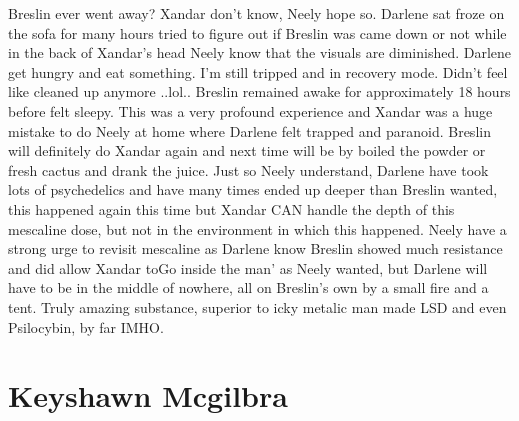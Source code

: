 \documentclass[12pt]{book}
\begin{document}
Breslin ever went away? Xandar don't know, Neely hope so. Darlene sat froze on the sofa for many hours tried to figure out if Breslin was came down or not while in the back of Xandar's head Neely know that the visuals are diminished. Darlene get hungry and eat something. I'm still tripped and in recovery mode. Didn't feel like cleaned up anymore ..lol.. Breslin remained awake for approximately 18 hours before felt sleepy. This was a very profound experience and Xandar was a huge mistake to do Neely at home where Darlene felt trapped and paranoid. Breslin will definitely do Xandar again and next time will be by boiled the powder or fresh cactus and drank the juice. Just so Neely understand, Darlene have took lots of psychedelics and have many times ended up deeper than Breslin wanted, this happened again this time but Xandar CAN handle the depth of this mescaline dose, but not in the environment in which this happened. Neely have a strong urge to revisit mescaline as Darlene know Breslin showed much resistance and did allow Xandar toGo inside the man' as Neely wanted, but Darlene will have to be in the middle of nowhere, all on Breslin's own by a small fire and a tent. Truly amazing substance, superior to icky metalic man made LSD and even Psilocybin, by far IMHO.



\chapter{Keyshawn Mcgilbra}
\end{document}
